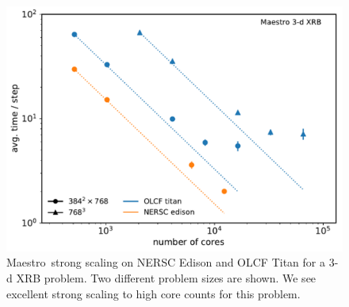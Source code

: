 \documentclass[a4paper]{jpconf}
\newcommand{\maestro}{{\sffamily Maestro}}
\begin{document}
\begin{figure}[t]
\centering
\includegraphics[width=0.48\linewidth]{titan_edison_maestro_scaling}
\begin{minipage}[b]{0.48\linewidth}
\caption{\label{fig:maestro_scaling} \maestro\ strong scaling on NERSC
  Edison and OLCF Titan for a 3-d XRB problem.  Two different problem
  sizes are shown.  We see excellent strong scaling to high core counts
  for this problem.\vspace{2em}}
\end{minipage}
\end{figure}
\end{document}
